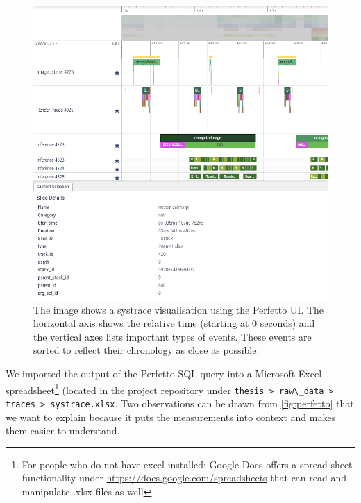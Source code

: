 \documentclass[
			   fontsize=11pt,
               paper=a4,
               bibliography=totoc,
               idxtotoc,
               headsepline,
               footsepline,
               footinclude=false,
               BCOR=12mm,
               DIV=13,
               openany,   %
               oneside    %
               ]
               {scrbook}
\newcommand{\code}[1]{\lstinline[basicstyle = \ttfamily\small]{#1}} %
\begin{document}
\begin{figure}[h] %
	\centering
	\includegraphics[width=.97\textwidth]{figures/perfetto_visualisation.png}
	\caption[Screenshot of Visual Systrace Analysis With Perfetto UI]{The image shows a systrace visualisation using the Perfetto UI. The horizontal axis shows the relative time (starting at 0 seconds) and the vertical axes lists important types of events. These events are sorted to reflect their chronology as close as possible.}
	\label{fig:perfetto}
\end{figure}

\newpage

We imported the output of the Perfetto SQL query into a Microsoft Excel spreadsheet\footnote{For people who do not have excel installed: Google Docs offers a spread sheet functionality under \url{https://docs.google.com/spreadsheets} that can read and manipulate .xlsx files as well} (located in the project repository under \code{thesis > raw\_data > traces > systrace.xlsx}. Two observations can be drawn from \autoref{fig:perfetto} that we want to explain because it puts the measurements into context and makes them easier to understand. \\
\end{document}
